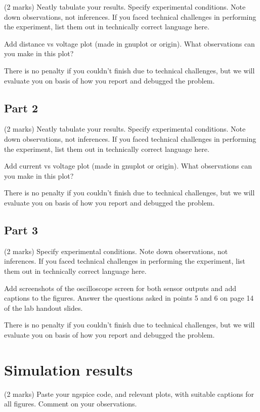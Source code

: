 \documentclass[12pt]{article}
\begin{document}
(2 marks) Neatly tabulate your results. Specify experimental conditions. Note down observations, not inferences. If you faced technical challenges in performing the experiment, list them out in technically correct language here.

Add distance vs voltage plot (made in gnuplot or origin). What observations can you make in this plot?

There is no penalty if you couldn't finish due to technical challenges, but we will evaluate you on basis of how you report and debugged the problem.

\subsection{Part 2}

(2 marks) Neatly tabulate your results. Specify experimental conditions. Note down observations, not inferences. If you faced technical challenges in performing the experiment, list them out in technically correct language here.

Add current vs voltage plot (made in gnuplot or origin). What observations can you make in this plot?

There is no penalty if you couldn't finish due to technical challenges, but we will evaluate you on basis of how you report and debugged the problem.

\subsection{Part 3}

(2 marks) Specify experimental conditions. Note down observations, not inferences. If you faced technical challenges in performing the experiment, list them out in technically correct language here.

Add screenshots of the oscilloscope screen for both sensor outputs and add captions to the figures. Answer the questions asked in points 5 and 6 on page 14 of the lab handout slides.

There is no penalty if you couldn't finish due to technical challenges, but we will evaluate you on basis of how you report and debugged the problem.

\section{Simulation results}

(2 marks) Paste your ngspice code, and relevant plots, with suitable captions for all figures. Comment on your observations.
\end{document}
